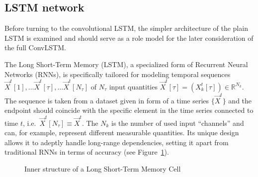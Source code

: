 \documentclass[
]{agujournal2019}
\begin{document}
\subsection{LSTM network}\label{lstm-network}

Before turning to the convolutional LSTM, the simpler architecture of
the plain LSTM is examined and should serve as a role model for the
later consideration of the full ConvLSTM.

The Long Short-Term Memory (LSTM), a specialized form of Recurrent
Neural Networks (RNNs), is specifically tailored for modeling temporal
sequences
\(\vec{X}^t[1], \ldots \vec{X}^t[\tau],\ldots \vec{X}^t[N_\tau]\) of
\(N_\tau\) input quantities
\(\vec{X}^t[\tau] = (X^t_k[\tau]) \in \mathbb{R}^{N_k}\). The sequence
is taken from a dataset given in form of a time series \(\{\vec{X}^t\}\)
and the endpoint should coincide with the specific element in the time
series connected to time \(t\),
i.e.~\(\vec{X}^t[N_\tau] \equiv \vec{X}^t\). The \(N_k\) is the number
of used input ``channels'' and can, for example, represent different
measurable quantities. Its unique design allows it to adeptly handle
long-range dependencies, setting it apart from traditional RNNs in terms
of accuracy (see Figure~\ref{fig-lstm}).

\begin{figure}


\caption{\label{fig-lstm}Inner structure of a Long Short-Term Memory
Cell}

\end{figure}%
\end{document}
